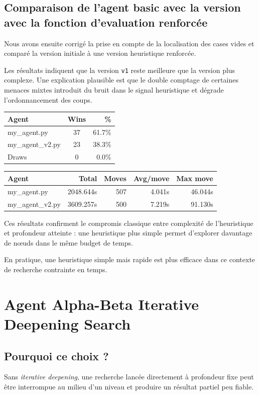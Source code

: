 \subsection{Comparaison de l'agent basic avec la version avec la fonction d'evaluation renforcée}

Nous avons ensuite corrigé la prise en compte de la localisation des cases vides et comparé la version initiale à une version heuristique renforcée.

Les résultats indiquent que la version \texttt{v1} reste meilleure que la version plus complexe. Une explication plausible est que le double comptage de certaines menaces mixtes introduit du bruit dans le signal heuristique et dégrade l'ordonnancement des coups.\\

\begin{tabular}{|l|c|r|}
    \hline
    Agent & Wins & \% \\
    \hline
    my\_agent.py & 37 & 61.7\% \\
    my\_agent\_v2.py & 23 & 38.3\% \\
    Draws & 0 & 0.0\%\\
    \hline 
\end{tabular}
\begin{tabular}{|l|r|r|r|r|}
    \hline
    Agent & Total & Moves & Avg/move & Max move \\
    \hline
    my\_agent.py & 2048.644s & 507 & 4.041s & 46.044s \\
    my\_agent\_v2.py & 3609.257s & 500 & 7.219s & 91.130s \\
    \hline
\end{tabular}

\bigskip

Ces résultats confirment le compromis classique entre complexité de l'heuristique et profondeur atteinte : une heuristique plus simple permet d'explorer davantage de nœuds dans le même budget de temps.

En pratique, une heuristique simple mais rapide est plus efficace dans ce contexte de recherche contrainte en temps.


\section{Agent Alpha-Beta Iterative Deepening Search}

\subsection{Pourquoi ce choix ?}
Sans \textit{iterative deepening}, une recherche lancée directement à profondeur fixe peut être interrompue au milieu d'un niveau et produire un résultat partiel peu fiable.\\

